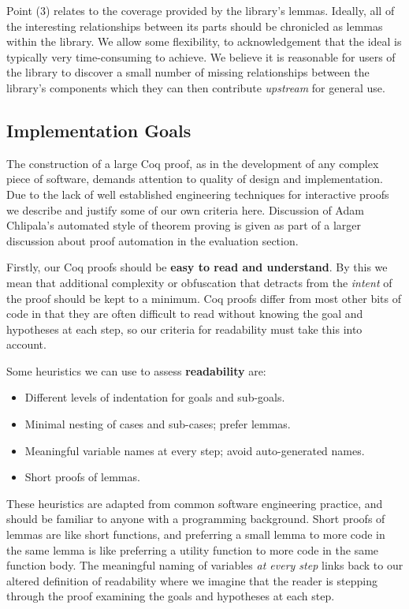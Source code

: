 \documentclass[]{unswthesis}
\let\i\textit
\let\b\textbf
\begin{document}
Point (3) relates to the coverage provided by the library's lemmas. Ideally, all of the interesting relationships between its parts should be chronicled as lemmas within the library. We allow some flexibility, to acknowledgement that the ideal is typically very time-consuming to achieve. We believe it is reasonable for users of the library to discover a small number of missing relationships between the library's components which they can then contribute \i{upstream} for general use.

\subsection{Implementation Goals}
\label{sec:impl-goals}

The construction of a large Coq proof, as in the development of any complex piece of software, demands attention to quality of design and implementation. Due to the lack of well established engineering techniques for interactive proofs we describe and justify some of our own criteria here. Discussion of Adam Chlipala's automated style of theorem proving is given as part of a larger discussion about proof automation in the evaluation section.

Firstly, our Coq proofs should be \b{easy to read and understand}. By this we mean that additional complexity or obfuscation that detracts from the \i{intent} of the proof should be kept to a minimum. Coq proofs differ from most other bits of code in that they are often difficult to read without knowing the goal and hypotheses at each step, so our criteria for readability must take this into account.

Some heuristics we can use to assess \b{readability} are:

\begin{itemize}
\item Different levels of indentation for goals and sub-goals.
\item Minimal nesting of cases and sub-cases; prefer lemmas.
\item Meaningful variable names at every step; avoid auto-generated names.
\item Short proofs of lemmas.
\end{itemize}

These heuristics are adapted from common software engineering practice, and should be familiar to anyone with a programming background. Short proofs of lemmas are like short functions, and preferring a small lemma to more code in the same lemma is like preferring a utility function to more code in the same function body. The meaningful naming of variables \i{at every step} links back to our altered definition of readability where we imagine that the reader is stepping through the proof examining the goals and hypotheses at each step.
\end{document}

